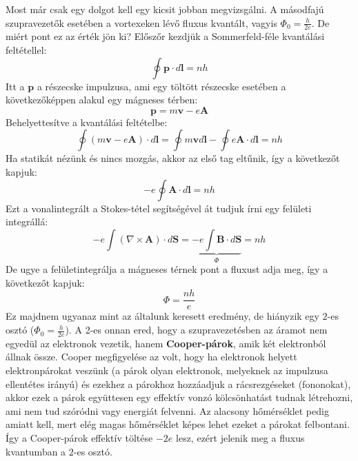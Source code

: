 \documentclass[../main.tex]{subfiles}
\begin{document}
Most már csak egy dolgot kell egy kicsit jobban megvizsgálni. A másodfajú szupravezetők esetében a vortexeken lévő fluxus kvantált, vagyis $\Phi_0 = \frac{h}{2e}$. De miért pont ez az érték jön ki?
Előszőr kezdjük a Sommerfeld-féle kvantálási feltétellel:
\begin{equation}
    \oint \mathbf{p} \cdot d\mathbf{l} = n h
\end{equation}
Itt a $\mathbf{p}$ a részecske impulzusa, ami egy töltött részecske esetében a következőképpen alakul egy mágneses térben:
\begin{equation}
    \mathbf{p} = m \mathbf{v} - e \mathbf{A}
\end{equation}
Behelyettesítve a kvantálási feltételbe:
\begin{equation}
    \oint (m \mathbf{v} - e \mathbf{A}) \cdot d\mathbf{l} = \oint m \mathbf{v} d\mathbf{l} - \oint e \mathbf{A} \cdot d\mathbf{l} = n h
\end{equation}
Ha statikát nézünk és nincs mozgás, akkor az első tag eltűnik, így a következőt kapjuk:
\begin{equation}
    - e \oint \mathbf{A} \cdot d\mathbf{l} = n h
\end{equation}
Ezt a vonalintegrált a Stokes-tétel segítségével át tudjuk írni egy felületi integrállá:
\begin{equation}
    - e \int (\nabla \times \mathbf{A}) \cdot d\mathbf{S} = \underbrace{- e \int \mathbf{B} \cdot d\mathbf{S}}_{\Phi} = n h
\end{equation}
De ugye a felületintegrálja a mágneses térnek pont a fluxust adja meg, így a következőt kapjuk:
\begin{equation}
    \Phi = \frac{n h}{e}
\end{equation} 
Ez majdnem ugyanaz mint az általunk keresett eredmény, de hiányzik egy $2$-es osztó ($\Phi_0 = \frac{h}{2e}$). A 2-es onnan ered, hogy a szupravezetésben az áramot nem egyedül az elektronok vezetik, hanem \textbf{Cooper-párok}, amik két elektronból állnak össze.
Cooper megfigyelése az volt, hogy ha elektronok helyett elektronpárokat veszünk (a párok olyan elektronok, melyeknek az impulzusa ellentétes irányú) és ezekhez a párokhoz hozzáadjuk a rácsrezgéseket (fononokat), akkor ezek a párok együttesen egy effektív vonzó kölcsönhatást tudnak létrehozni,
ami nem tud szóródni vagy energiát felvenni. Az alacsony hőmérséklet pedig amiatt kell, mert elég magas hőmérséklet képes lehet ezeket a párokat felbontani. Így a Cooper-párok effektív töltése $-2e$ lesz, ezért jelenik meg a fluxus kvantumban a $2$-es osztó.
\end{document}
